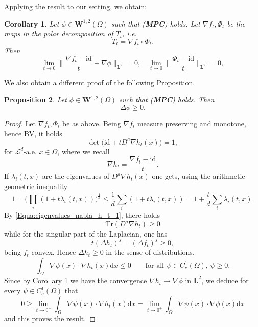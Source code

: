 \documentclass[11pt, twoside, reqno]{amsart}
\theoremstyle{definition} \newtheorem{definition}{Definition}[section]
\theoremstyle{definition} \newtheorem{remark}[definition]{Remark}
\theoremstyle{plain} \newtheorem{lemma}[definition]{Lemma}
\theoremstyle{plain} \newtheorem{proposition}[definition]{Proposition}
\theoremstyle{plain} \newtheorem{theorem}[definition]{Theorem}
\theoremstyle{plain} \newtheorem{corollary}[definition]{Corollary}
\theoremstyle{definition} \newtheorem{example}[definition]{Example}
\theoremstyle{plain} \newtheorem{claim}[clai]{Claim}
\theoremstyle{definition} \newtheorem{assumption}[definition]{Assumption}
\newcommand{\Id}{\mathrm{id}}
\newcommand{\1}{\mathbbm 1}
\numberwithin{equation}{section} %
\theoremstyle{plain} \newtheorem*{theorem*}{Theorem}
\theoremstyle{plain} \newtheorem{mthm}[maintheorem]{Main Theorem}
\theoremstyle{plain} \newtheorem*{mthm*}{Main Theorem}
\theoremstyle{plain} \newtheorem*{conjecture*}{Conjecture}
\theoremstyle{plain} \newtheorem{conjecture}[definition]{Conjecture}
\theoremstyle{plain} \newtheorem*{problem*}{Problem}
\begin{document}
Applying the result to our setting, we obtain:

\begin{corollary}
\label{Cor:conser_transprto}
Let $\phi \in \mathbf W^{1,2}(\Omega)$ such that \emph{(\textbf{MPC})} holds. Let $\nabla f_t, \Phi_t$ be the maps in the polar decomposition of $T_t$, i.e.
$$
T_t = \nabla f_t \circ \Phi_t.
$$
Then 
\begin{equation*}
\lim_{t \to 0} \bigg\| \frac{{\nabla f_t} - \Id}{t} - \nabla \phi \bigg\|_{\mathbf L^2} = 0, \quad \lim_{t \to 0} \bigg\| \frac{\Phi_t - \Id}{t} \bigg\|_{\mathbf L^2} = 0,
\end{equation*}
\end{corollary}

We also obtain a different proof of the following Proposition.

\begin{proposition}
\label{Prop:laplacian_1}
Let $\phi \in \mathbf W^{1,2}(\Omega)$ such that \emph{(\textbf{MPC})} holds. Then
$$
\Delta \phi \geq 0.
$$
\end{proposition}

\begin{proof}
Let $\nabla f_t, \Phi_t$ be as above.
Being $\nabla {f_t}$ measure preserving and monotone, hence BV, it holds
\begin{equation*}
\det \big( \Id + t D^a \nabla h_t(x) \big) = 1,
\end{equation*}
for $\mathscr L^d$-a.e. $x \in \Omega$, where we recall 
$$
\nabla h_t = \frac{\nabla f_t - \Id}{t}.
$$
If $\lambda_{i}(t,x)$ are the eigenvalues of $D^a \nabla h_t(x)$ one gets, using the arithmetic-geometric inequality
\begin{equation}
\label{Equa:eigenvalues_nabla_h_t_1}
1 = \bigg( \prod_i (1 + t \lambda_{i}(t,x)) \bigg)^{\frac{1}{d}} \leq \frac{1}{d} \sum_i (1 + t \lambda_{i}(t,x)) = 1 + \frac{t}{d} \sum_i \lambda_{i}(t,x).
\end{equation}
By \eqref{Equa:eigenvalues_nabla_h_t_1}, there holds
$$
\mathrm{Tr}(D^a \nabla h_t) \geq 0
$$
while for the singular part of the Laplacian, one has
\begin{equation*}
t (\Delta h_t)^s = (\Delta {f_t})^s \geq 0,
\end{equation*}
being $f_t$ convex. Hence $\Delta h_t \geq 0$ in the sense of distributions, 
$$
\int_{\Omega} \nabla \psi(x) \cdot \nabla h_t(x) \mathrm{d} x \leq 0 \qquad \text{for all $\psi \in C^1_c(\Omega)$, $\psi \geq 0$}.
$$
Since by Corollary \ref{Cor:conser_transprto} we have the convergence $\nabla h_t \to \nabla \phi$  in $\mathbf L^2$, we deduce for every $\psi \in C^1_c(\Omega)$ that 
$$
0 \geq \lim_{t \to 0^+} \int_{\Omega} \nabla \psi(x) \cdot \nabla h_t(x) \mathrm{d} x = \lim_{t \to 0^+} \int_{\Omega} \nabla \psi(x) \cdot \nabla \phi(x) \mathrm{d} x 
$$
and this proves the result.
\end{proof}
    
\end{document}
